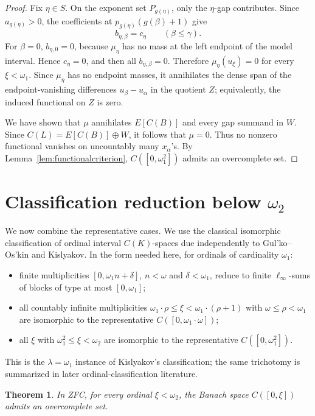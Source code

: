 \documentclass[11pt]{article}
\newtheorem{theorem}{Theorem}
\begin{document}
\begin{proof}
Fix \(\eta\in S\).  On the exponent set \(P_{g(\eta)}\), only the
\(\eta\)-gap contributes.  Since \(a_{g(\eta)}>0\), the coefficients at
\(p_{g(\eta)}(g(\beta)+1)\) give
\[
   b_{\eta,\beta}=c_\eta\qquad(\beta\leq\gamma).
\]
For \(\beta=0\), \(b_{\eta,0}=0\), because \(\mu_\eta\) has no mass at the
left endpoint of the model interval.  Hence \(c_\eta=0\), and then all
\(b_{\eta,\beta}=0\).  Therefore \(\mu_\eta(u_\xi)=0\) for every
\(\xi<\omega_1\).  Since \(\mu_\eta\) has no endpoint masses, it annihilates
the dense span of the endpoint-vanishing differences \(u_\beta-u_\alpha\) in
the quotient \(Z\); equivalently, the induced functional on \(Z\) is zero.

We have shown that \(\mu\) annihilates \(E[C(B)]\) and every gap summand in
\(W\).  Since \(C(L)=E[C(B)]\oplus W\), it follows that \(\mu=0\).  Thus no
nonzero functional vanishes on uncountably many \(x_\alpha\)'s.  By
Lemma~\ref{lem:functionalcriterion}, \(C([0,\omega_1^2])\) admits an
overcomplete set.
\end{proof}

\section{Classification reduction below \texorpdfstring{\(\omega_2\)}{omega2}}

We now combine the representative cases.  We use the classical isomorphic
classification of ordinal interval \(C(K)\)-spaces due independently to
Gul'ko--Os'kin and Kislyakov.  In the form needed here, for ordinals of
cardinality \(\omega_1\):
\begin{itemize}[leftmargin=2em]
\item finite multiplicities \([0,\omega_1 n+\delta]\), \(n<\omega\) and
      \(\delta<\omega_1\), reduce to finite \(\ell_\infty\)-sums of blocks of
      type at most \([0,\omega_1]\);
\item all countably infinite multiplicities
      \(\omega_1\cdot\rho\leq \xi<\omega_1\cdot(\rho+1)\) with
      \(\omega\leq\rho<\omega_1\) are isomorphic to the representative
      \(C([0,\omega_1\cdot\omega])\);
\item all \(\xi\) with \(\omega_1^2\leq\xi<\omega_2\) are isomorphic to the
      representative \(C([0,\omega_1^2])\).
\end{itemize}
This is the \(\lambda=\omega_1\) instance of Kislyakov's classification; the
same trichotomy is summarized in later ordinal-classification literature.

\begin{theorem}\label{thm:full}
In ZFC, for every ordinal \(\xi<\omega_2\), the Banach space
\(C([0,\xi])\) admits an overcomplete set.
\end{theorem}
\end{document}

